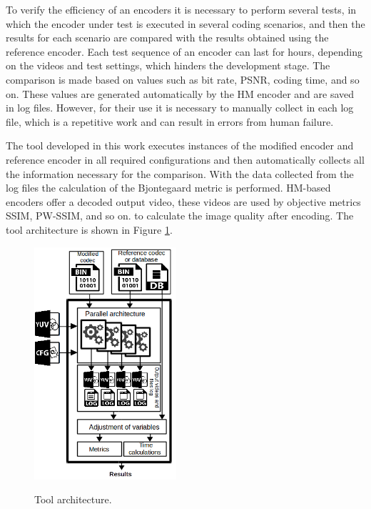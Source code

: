 \documentclass[journal]{IEEEtran}
\begin{document}
To verify the efficiency of an encoders it is necessary to perform several tests, in which the encoder under test is executed in several coding scenarios, and then the results for each scenario are compared with the results obtained using the reference encoder. Each test sequence of an encoder can last for hours, depending on the videos and test settings, which hinders the development stage. The comparison is made based on values such as bit rate, PSNR, coding time, and so on. These values are generated automatically by the HM encoder and are saved in log files. However, for their use it is necessary to manually collect in each log file, which is a repetitive work and can result in errors from human failure. 

The tool developed in this work executes instances of the modified encoder and reference encoder in all required configurations and then automatically collects all the information necessary for the comparison. With the data collected from the log files the calculation of the Bjontegaard \cite{Bjontegaard} metric is performed. HM-based encoders offer a decoded output video, these videos are used by objective metrics SSIM, PW-SSIM, and so on. to calculate the image quality after encoding. The tool architecture is shown in Figure \ref{fig:fluxo}. 



\FloatBarrier
\begin{figure}[!ht]
	\centering
	\caption{Tool architecture.}
	\includegraphics[width=0.47\textwidth]{figures/fluxo.png}
	\label{fig:fluxo}	
\end{figure}
\FloatBarrier
\end{document}
